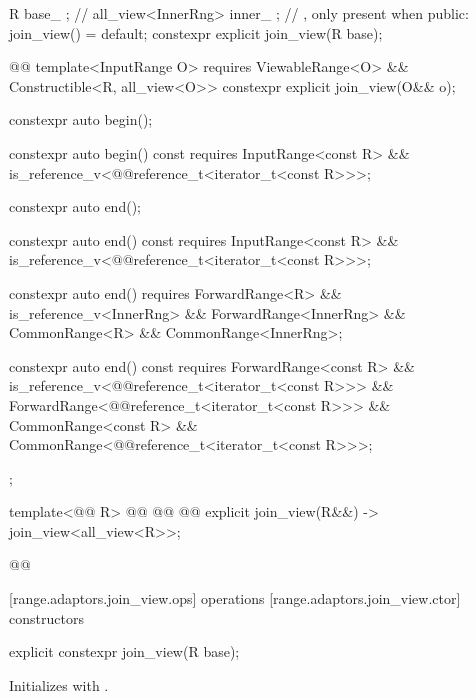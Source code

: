 {\begin{codeblock}
{{    R base_ {};                   // \expos
    all_view<InnerRng> inner_ {}; // \expos, only present when 
  public:
    join_view() = default;
    constexpr explicit join_view(R base);

    @@
    template<InputRange O>
        requires ViewableRange<O> && Constructible<R, all_view<O>>
      constexpr explicit join_view(O&& o);

    constexpr auto begin();

    constexpr auto begin() const requires InputRange<const R> &&
      is_reference_v<@@reference_t<iterator_t<const R>>>;

    constexpr auto end();

    constexpr auto end() const requires InputRange<const R> &&
      is_reference_v<@@reference_t<iterator_t<const R>>>;

    constexpr auto end() requires ForwardRange<R> &&
      is_reference_v<InnerRng> && ForwardRange<InnerRng> &&
      CommonRange<R> && CommonRange<InnerRng>;

    constexpr auto end() const requires ForwardRange<const R> &&
      is_reference_v<@@reference_t<iterator_t<const R>>> &&
      ForwardRange<@@reference_t<iterator_t<const R>>> &&
      CommonRange<const R> && CommonRange<@@reference_t<iterator_t<const R>>>;
  };

  template<@@ R>
    @@
      @@
      @@
    explicit join_view(R&&) -> join_view<all_view<R>>;
}@\oldtxt{\}}@
\end{codeblock}

[range.adaptors.join_view.ops]{ operations}
[range.adaptors.join_view.ctor]{ constructors}

%
\begin{itemdecl}
explicit constexpr join_view(R base);
\end{itemdecl}

\begin{itemdescr}
\pnum
\effects Initializes  with .
\end{itemdescr}

}

